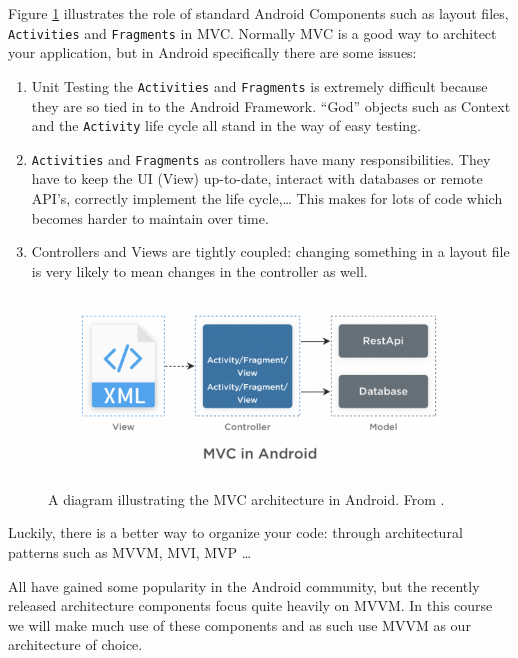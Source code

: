 Figure \ref{fig:MVCdiagram} illustrates the role of standard Android Components such as layout files, \lstinline!Activities! and \lstinline!Fragments! in MVC.
Normally MVC is a good way to architect your application, but in Android specifically there are some issues:

\begin{enumerate}
	\item Unit Testing the \lstinline!Activities! and \lstinline!Fragments! is extremely difficult because they are so tied in to the Android Framework.
	``God'' objects such as Context and the \lstinline!Activity! life cycle all stand in the way of easy testing.
	\item \lstinline!Activities! and \lstinline!Fragments! as controllers have many responsibilities. 
	They have to keep the UI (View) up-to-date, interact with databases or remote API's, correctly implement the life cycle,\ldots
	This makes for lots of code which becomes harder to maintain over time.
	\item Controllers and Views are tightly coupled: changing something in a layout file is very likely to mean changes in the controller as well. 
\end{enumerate}

\begin{figure}[ht]
	\centering
	\includegraphics[width=\textwidth]{images/mvvm/MVC_diagram.png}
	\label{fig:MVCdiagram}
	\caption{A diagram illustrating the MVC architecture in Android. From \cite{simform}.}
\end{figure}

Luckily, there is a better way to organize your code: through architectural patterns such as MVVM, MVI, MVP \ldots

All have gained some popularity in the Android community, but the recently released architecture components \cite{architectureComponents} focus quite heavily on MVVM.
In this course we will make much use of these components and as such use MVVM as our architecture of choice.

